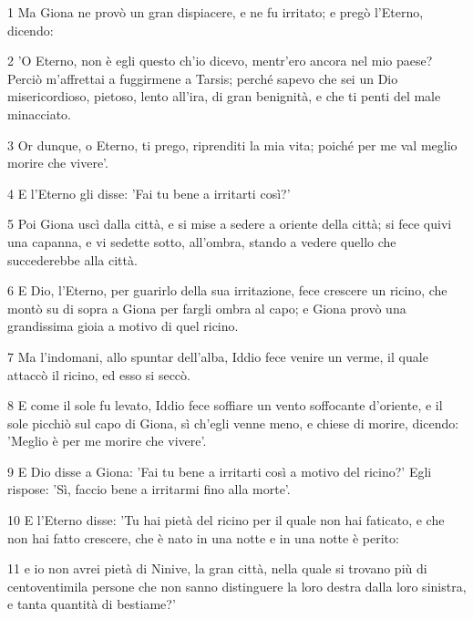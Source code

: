\par 1 Ma Giona ne provò un gran dispiacere, e ne fu irritato; e pregò l'Eterno, dicendo:
\par 2 'O Eterno, non è egli questo ch'io dicevo, mentr'ero ancora nel mio paese? Perciò m'affrettai a fuggirmene a Tarsis; perché sapevo che sei un Dio misericordioso, pietoso, lento all'ira, di gran benignità, e che ti penti del male minacciato.
\par 3 Or dunque, o Eterno, ti prego, riprenditi la mia vita; poiché per me val meglio morire che vivere'.
\par 4 E l'Eterno gli disse: 'Fai tu bene a irritarti così?'
\par 5 Poi Giona uscì dalla città, e si mise a sedere a oriente della città; si fece quivi una capanna, e vi sedette sotto, all'ombra, stando a vedere quello che succederebbe alla città.
\par 6 E Dio, l'Eterno, per guarirlo della sua irritazione, fece crescere un ricino, che montò su di sopra a Giona per fargli ombra al capo; e Giona provò una grandissima gioia a motivo di quel ricino.
\par 7 Ma l'indomani, allo spuntar dell'alba, Iddio fece venire un verme, il quale attaccò il ricino, ed esso si seccò.
\par 8 E come il sole fu levato, Iddio fece soffiare un vento soffocante d'oriente, e il sole picchiò sul capo di Giona, sì ch'egli venne meno, e chiese di morire, dicendo: 'Meglio è per me morire che vivere'.
\par 9 E Dio disse a Giona: 'Fai tu bene a irritarti così a motivo del ricino?' Egli rispose: 'Sì, faccio bene a irritarmi fino alla morte'.
\par 10 E l'Eterno disse: 'Tu hai pietà del ricino per il quale non hai faticato, e che non hai fatto crescere, che è nato in una notte e in una notte è perito:
\par 11 e io non avrei pietà di Ninive, la gran città, nella quale si trovano più di centoventimila persone che non sanno distinguere la loro destra dalla loro sinistra, e tanta quantità di bestiame?'


